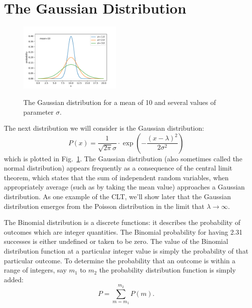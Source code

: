\documentclass[12pt,oneside]{book}
\begin{document}
\section{The Gaussian Distribution}

\begin{figure}[htbp]
\begin{center}
{\includegraphics[width=0.45\textwidth]{figs/gaussian.pdf}}
\end{center}
\caption{\label{fig:gaussian}  The Gaussian distribution for a mean of 10 and several values of parameter $\sigma$.}
\end{figure}

The next distribution we will consider is the Gaussian distribution:
\begin{equation}
\label{eqn:gaussian}
P(x) = \frac{1}{\sqrt{2\pi} \sigma} \cdot \exp\left( - \frac{(x - \lambda)^2}{2 \sigma^2}\right)
\end{equation}
which is plotted in Fig.~\ref{fig:gaussian}.  The Gaussian
distribution (also sometimes called the normal distribution) appears
frequently as a consequence of the central limit theorem, which states
that the sum of independent random variables, when appropriately
average (such as by taking the mean value) approaches a Gaussian
distribution.  As one example of the CLT, we'll show later that the
Gaussian distribution emerges from the Poisson distribution in the
limit that $\lambda \to \infty$.

The Binomial distribution is a discrete functions: it describes the
probability of outcomes which are integer quantities.  The Binomial
probability for having 2.31 successes is either undefined or taken to be
zero.  The value of the Binomial distribution function at
a particular integer value is simply the probability of that
particular outcome.  To determine the probability that an outcome is
within a range of integers, say $m_1$ to $m_2$ the probability
distribution function is simply added:
\begin{displaymath}
P = \sum_{m=m_1}^{m_2} P(m).
\end{displaymath}
\end{document}
